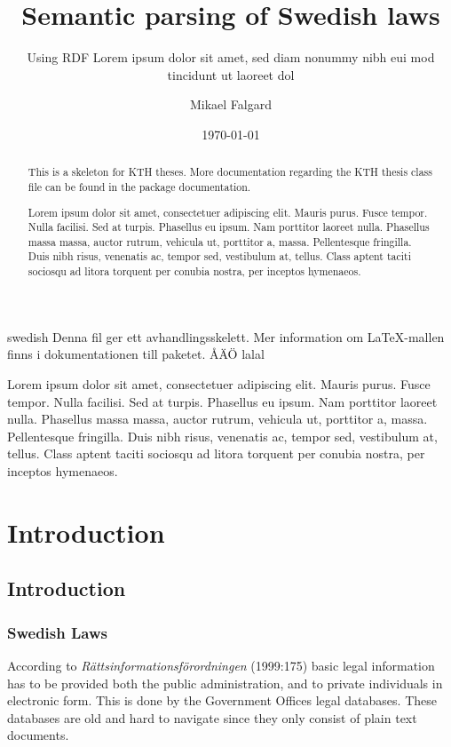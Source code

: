 \documentclass[a4paper,11pt]{kth-mag}
\title{Semantic parsing of Swedish laws}
\subtitle{Using RDF Lorem ipsum dolor sit amet, sed diam nonummy nibh eui
              mod tincidunt ut laoreet dol}
\author{Mikael Falgard}
\date{\today}
\begin{document}
\frontmatter
\pagestyle{empty}
\removepagenumbers
\maketitle
{}
\begin{abstract}
  This is a skeleton for KTH theses. More documentation
  regarding the KTH thesis class file can be found in
  the package documentation.

Lorem ipsum dolor sit amet, consectetuer adipiscing elit. Mauris
purus. Fusce tempor. Nulla facilisi. Sed at turpis. Phasellus eu
ipsum. Nam porttitor laoreet nulla. Phasellus massa massa, auctor
rutrum, vehicula ut, porttitor a, massa. Pellentesque fringilla. Duis
nibh risus, venenatis ac, tempor sed, vestibulum at, tellus. Class
aptent taciti sociosqu ad litora torquent per conubia nostra, per
inceptos hymenaeos.
\end{abstract}
\clearpage
\begin{foreignabstract}{swedish}
  Denna fil ger ett avhandlingsskelett.
  Mer information om \LaTeX-mallen finns i
  dokumentationen till paketet. ÅÄÖ lalal

Lorem ipsum dolor sit amet, consectetuer adipiscing elit. Mauris
purus. Fusce tempor. Nulla facilisi. Sed at turpis. Phasellus eu
ipsum. Nam porttitor laoreet nulla. Phasellus massa massa, auctor
rutrum, vehicula ut, porttitor a, massa. Pellentesque fringilla. Duis
nibh risus, venenatis ac, tempor sed, vestibulum at, tellus. Class
aptent taciti sociosqu ad litora torquent per conubia nostra, per
inceptos hymenaeos.
\end{foreignabstract}
\clearpage
\tableofcontents*
\mainmatter
\pagestyle{newchap}

\part{Introduction}
\chapter{Introduction}

\section{Swedish Laws}

According to \textit{Rättsinformationsförordningen} (1999:175) basic legal information has to be provided both the public administration, and to private individuals in electronic form. This is done by the Government Offices legal databases. These databases are old and hard to navigate since they only consist of plain text documents.
\end{document}

